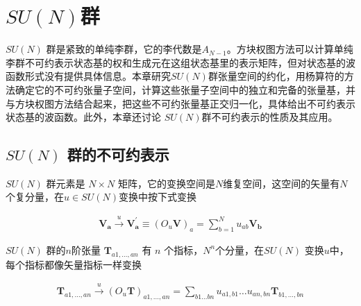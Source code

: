 
\setcounter{chapter}{7}

\chapter{
\texorpdfstring{$SU(N)$}{Lg}群
}

$SU(N)$ 群是紧致的单纯李群，它的李代数是$A_{N-1}$。方块权图方法可以计算单纯李群不可约表示状态基的权和生成元在这组状态基里的表示矩阵，但对状态基的波函数形式没有提供具体信息。本章研究$SU(N)$群张量空间的约化，用杨算符的方法确定它的不可约张量子空间，计算这些张量子空间中的独立和完备的张量基，并与方块权图方法结合起来，把这些不可约张量基正交归一化，具体给出不可约表示状态基的波函数。此外，本章还讨论 $SU(N)​$群不可约表示的性质及其应用。

\section{
	\texorpdfstring{$SU(N)$}{Lg}
	群的不可约表示
}

$SU(N)$ 群元素是 $N \times N$ 矩阵，它的变换空间是$N$维复空间，这空间的矢量有$N$个复分量，在$u \in SU(N)$变换中按下式变换

\begin{newprop}
\begin{equation}\begin{aligned}
\label{eq.8.1.1}
\mathbf{V_a}  \stackrel{u}{\to} 
\mathbf{V^\prime_a} \equiv (O_u \mathbf{V})_a=
\sum\limits_{b=1}^N u_{ab} \mathbf{V_b}
\end{aligned}\end{equation}
\end{newprop}


$SU(N)$ 群的$n$阶张量 $\mathbf{T}_{a1,\ldots,an}$ 有 $n$ 个指标，$N^n$个分量，在$SU(N)$ 变换$u$中，每个指标都像矢量指标一样变换

\begin{newprop}
\begin{equation}\begin{aligned}
\label{eq.8.1.2}
\mathbf{T}_{a1,\ldots,an} \stackrel{u}{\to} 
(O_u \mathbf{T})_{a1,\ldots,an}=\sum\limits_{b1\ldots bn}
u_{a1,b1}\ldots u_{an,bn}\mathbf{T}_{b1,\ldots,bn}
\end{aligned}\end{equation}
\end{newprop}

